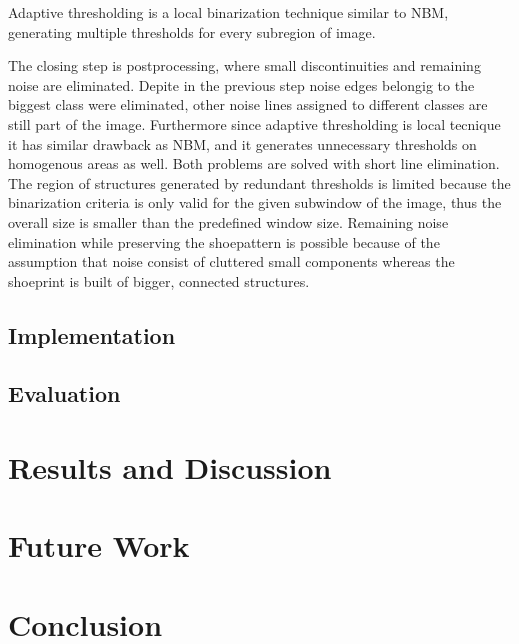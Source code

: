 \documentclass[draft,final]{vutinfth} %
\begin{document}
Adaptive thresholding is a local binarization technique similar to NBM, generating multiple thresholds for every subregion of image.
\par
The closing step is postprocessing, where small discontinuities and remaining noise are eliminated.
Depite in the previous step noise edges belongig to the biggest class were eliminated, other noise lines assigned to different classes are still part of the image.
Furthermore since adaptive thresholding is local tecnique it has similar drawback as NBM, and it generates unnecessary thresholds on homogenous areas as well.
Both problems are solved with short line elimination.
The region of structures generated by redundant thresholds is limited because the binarization criteria is only valid for the given subwindow of the image, thus the overall size is smaller than the predefined window size.
Remaining noise elimination while preserving the shoepattern is possible because of the assumption that noise consist of cluttered small components whereas the shoeprint is built of bigger, connected structures.


\section{Implementation}

\section{Evaluation}

\chapter{Results and Discussion}

\chapter{Future Work}

\chapter{Conclusion}


\backmatter


\cleardoublepage %






\end{document}
